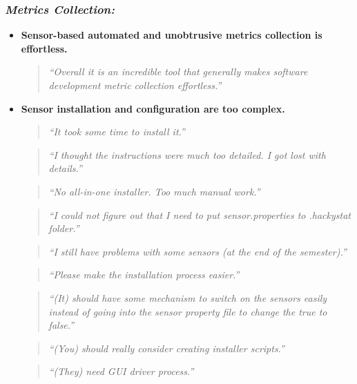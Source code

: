 \subsubsection{\textit{Metrics Collection:}}
\begin{itemize}
	\item \textbf{Sensor-based automated and unobtrusive metrics collection is effortless.}
    \begin{quote} \textit{``Overall it is an incredible tool that generally makes 
           software development metric collection effortless.''}\end{quote}
 
  \item \textbf{Sensor installation and configuration are too complex.}
    \begin{quote} \textit{``It took some time to install it.''} \end{quote}
    \begin{quote} \textit{``I thought the instructions were much too 
           detailed. I got lost with details.''} \end{quote}
    \begin{quote} \textit{``No all-in-one installer. Too much manual 
           work.''} \end{quote}  
    \begin{quote} \textit{``I could not figure out that I need to put 
           sensor.properties to .hackystat folder.''} \end{quote}
    \begin{quote} \textit{``I still have problems with some sensors
           (at the end of the semester).''} \end{quote} 
    \begin{quote} \textit{``Please make the installation process 
           easier.''} \end{quote}
    \begin{quote} \textit{``(It) should have some mechanism to switch on 
           the sensors easily instead of going into the sensor property file 
           to change the true to false.''} \end{quote}
    \begin{quote} \textit{``(You) should really consider creating 
           installer scripts.''} \end{quote}  
    \begin{quote} \textit{``(They) need GUI driver process.''} \end{quote}           
           


\end{itemize}
